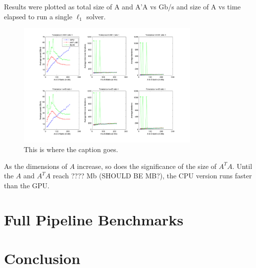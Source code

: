 \documentclass[10pt,twocolumn,letterpaper]{article}
\begin{document}
Results were plotted as total size of A and A'A vs Gb/s and size of A vs time
elapsed to run a single $\ell_1$ solver.

\begin{figure}
\centering
\includegraphics[width=3.5in]{figures/PALM_benchmark_ratio_1}
\caption{This is where the caption goes.}
\label{fig:uniqueidentifierforthisimage}
\end{figure}

As the dimensions of $A$ increase, so does the significance of the size of
$A^TA$.  Until the $A$ and $A^TA$ reach ???? Mb (SHOULD BE MB?), the CPU version runs faster
than the GPU.  

\section{Full Pipeline Benchmarks}

\section{Conclusion}

{\small


}
\end{document}

